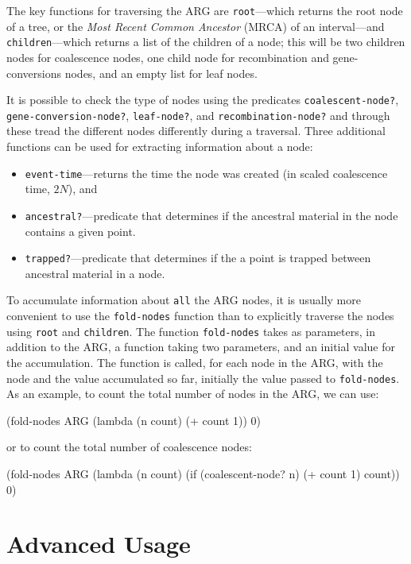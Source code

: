 \documentclass{manual}
\begin{document}
The key functions for traversing the ARG are \texttt{root}---which
returns the root node of a tree, or the \emph{Most Recent Common
  Ancestor} (MRCA) of an interval---and \texttt{children}---which
returns a list of the children of a node; this will be two children
nodes for coalescence nodes, one child node for recombination and
gene-conversions nodes, and an empty list for leaf nodes.

It is possible to check the type of nodes using the predicates
\texttt{coalescent-node?}, \texttt{gene-conversion-node?},
\texttt{leaf-node?}, and \texttt{recombination-node?} and through
these tread the different nodes differently during a traversal.  Three
additional functions can be used for extracting information about a
node:
\begin{itemize}
\item \texttt{event-time}---returns the time the node was created (in
  scaled coalescence time, $2N$), and
\item \texttt{ancestral?}---predicate that determines if the
  ancestral material in the node contains a given point.
\item \texttt{trapped?}---predicate that determines if the
  a point is trapped between ancestral material in a node.
\end{itemize}

To accumulate information about \texttt{all} the ARG nodes, it is
usually more convenient to use the \texttt{fold-nodes} function than
to explicitly traverse the nodes using \texttt{root} and
\texttt{children}.  The function \texttt{fold-nodes} takes as
parameters, in addition to the ARG, a function taking two parameters,
and an initial value for the accumulation.  The function is called,
for each node in the ARG, with the node and the value accumulated so
far, initially the value passed to \texttt{fold-nodes}.  As an
example, to count the total number of nodes in the ARG, we can use:
\begin{code}
(fold-nodes ARG (lambda (n count) (+ count 1)) 0)
\end{code}
or to count the total number of coalescence nodes:
\begin{code}
(fold-nodes ARG 
            (lambda (n count) 
               (if (coalescent-node? n) (+ count 1) count)) 
            0)
\end{code}


\section{Advanced Usage}
\label{sec:advanced-usage}
\end{document}

